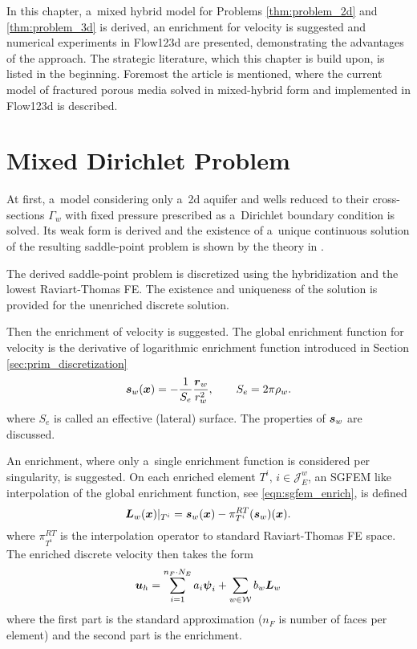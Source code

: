 
In this chapter, a~mixed hybrid model for Problems \ref{thm:problem_2d} and \ref{thm:problem_3d} is derived,
an enrichment for velocity is suggested and numerical experiments in Flow123d are presented, demonstrating
the advantages of the approach.
The strategic literature, which this chapter is build upon, is listed in the beginning.
Foremost the article \cite{sistek_bddc_2015} is mentioned, where the current model 
of fractured porous media solved in mixed-hybrid form and implemented in Flow123d is described.


\section{Mixed Dirichlet Problem}
At first, a~model considering only a~2d aquifer and wells reduced to their cross-sections $\Gamma_w$
with fixed pressure prescribed as a~Dirichlet boundary condition is solved.
Its weak form is derived and the existence of a~unique continuous solution of the resulting saddle-point
problem is shown by the theory in \cite{brezzi_mixed_1991}.

The derived saddle-point problem is discretized using the hybridization and the lowest Raviart-Thomas FE.
The existence and uniqueness of the solution is provided for the unenriched discrete solution.

Then the enrichment of velocity is suggested.
The global enrichment function for velocity is the derivative of logarithmic enrichment function introduced in Section \ref{sec:prim_discretization}
\begin{equation}
    \mathbf{\boldsymbol{s}}_w(\mathbf{\boldsymbol{x}}) = -\frac{1}{S_e} \frac{\mathbf{\boldsymbol{r}}_w}{r_w^2}, \qquad S_e = 2\pi\rho_w.
\end{equation}
where $S_e$ is called an effective (lateral) surface.
The properties of $\mathbf{\boldsymbol{s}}_w$ are discussed.

An enrichment, where only a~single enrichment function is considered per singularity, is suggested.
On each enriched element $T^i,\, i\in\mathcal{J}^w_E$, an SGFEM like interpolation 
of the global enrichment function, see \eqref{eqn:sgfem_enrich}, is defined
\begin{equation}
    \mathbf{\boldsymbol{L}}_{w}(\mathbf{\boldsymbol{x}})|_{T^i} = \mathbf{\boldsymbol{s}}_w(\mathbf{\boldsymbol{x}}) - \pi^{RT}_{T^i}(\mathbf{\boldsymbol{s}}_w)(\mathbf{\boldsymbol{x}}).
    \label{eqn:local_enr_vel}
\end{equation}
where $\pi^{RT}_{T^i}$ is the interpolation operator to standard Raviart-Thomas FE space.
The enriched discrete velocity then takes the form
\begin{equation}
    \mathbf{\boldsymbol{u}}_h = 
    \sum \limits_{i=1}^{n_F\cdot N_E} a_i \mathbf{\boldsymbol{\psi}}_i + 
    \sum \limits_{w\in\mathcal{W}} b_w \mathbf{\boldsymbol{L}}_{w}
    \label{eqn:velocity_enriched_approximation}
\end{equation}
where the first part is the standard approximation ($n_F$ is number of faces per element)
and the second part is the enrichment.

